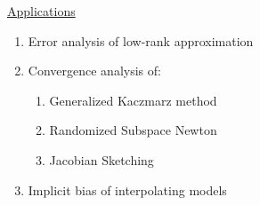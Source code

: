 \documentclass[8pt]{beamer}
\begin{document}
\begin{frame}
\begin{columns}
\begin{column}{0.53\textwidth}
    \begin{center}
      {\large\underline{Applications}}
    \end{center}
    \vspace{-2mm}
 \begin{enumerate}
\item Error analysis of low-rank approximation
\item Convergence analysis of:
  \begin{enumerate}
  \item Generalized Kaczmarz method
  \item Randomized Subspace Newton
  \item Jacobian Sketching
  \end{enumerate}
\item Implicit bias of interpolating models
\end{enumerate}

\end{column}
\end{columns}
\pause\pause\pause\pause
\end{frame}
\end{document}
